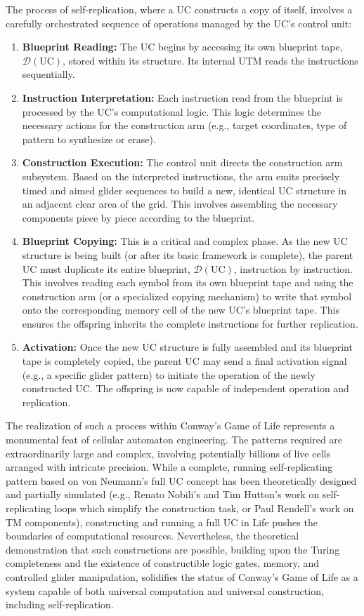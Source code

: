 \documentclass{article}
\theoremstyle{definition}
\theoremstyle{plain}
\theoremstyle{plain}
\begin{document}
The process of self-replication, where a UC constructs a copy of itself, involves a carefully orchestrated sequence of operations managed by the UC's control unit:

\begin{enumerate}
  \item \textbf{Blueprint Reading:} The UC begins by accessing its own blueprint tape, $\mathcal{D}(\text{UC})$, stored within its structure. Its internal UTM reads the instructions sequentially.
  \item \textbf{Instruction Interpretation:} Each instruction read from the blueprint is processed by the UC's computational logic. This logic determines the necessary actions for the construction arm (e.g., target coordinates, type of pattern to synthesize or erase).
  \item \textbf{Construction Execution:} The control unit directs the construction arm subsystem. Based on the interpreted instructions, the arm emits precisely timed and aimed glider sequences to build a new, identical UC structure in an adjacent clear area of the grid. This involves assembling the necessary components piece by piece according to the blueprint.
  \item \textbf{Blueprint Copying:} This is a critical and complex phase. As the new UC structure is being built (or after its basic framework is complete), the parent UC must duplicate its entire blueprint, $\mathcal{D}(\text{UC})$, instruction by instruction. This involves reading each symbol from its own blueprint tape and using the construction arm (or a specialized copying mechanism) to write that symbol onto the corresponding memory cell of the new UC's blueprint tape. This ensures the offspring inherits the complete instructions for further replication.
  \item \textbf{Activation:} Once the new UC structure is fully assembled and its blueprint tape is completely copied, the parent UC may send a final activation signal (e.g., a specific glider pattern) to initiate the operation of the newly constructed UC. The offspring is now capable of independent operation and replication.
\end{enumerate}

The realization of such a process within Conway's Game of Life represents a monumental feat of cellular automaton engineering. The patterns required are extraordinarily large and complex, involving potentially billions of live cells arranged with intricate precision. While a complete, running self-replicating pattern based on von Neumann's full UC concept has been theoretically designed and partially simulated (e.g., Renato Nobili's and Tim Hutton's work on self-replicating loops which simplify the construction task, or Paul Rendell's work on TM components), constructing and running a full UC in Life pushes the boundaries of computational resources. Nevertheless, the theoretical demonstration that such constructions are possible, building upon the Turing completeness and the existence of constructible logic gates, memory, and controlled glider manipulation, solidifies the status of Conway's Game of Life as a system capable of both universal computation and universal construction, including self-replication.
\end{document}
